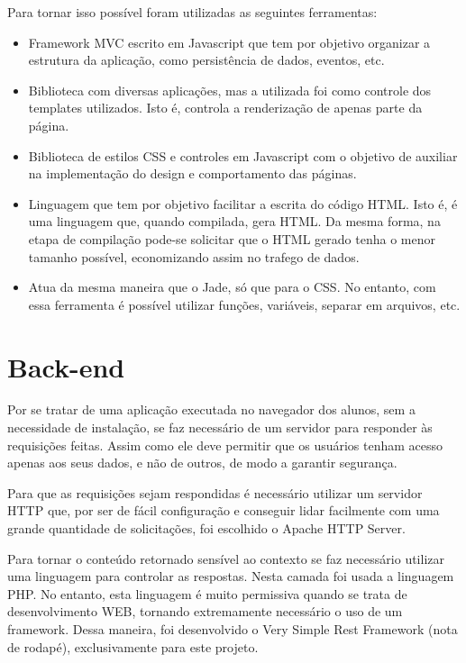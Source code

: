\documentclass[graduacao,brazil]{ThesisPUC}
\begin{document}
Para tornar isso possível foram utilizadas as seguintes ferramentas:
\begin{itemize}
	\item \cite{Backbone} Framework MVC escrito em Javascript que tem por objetivo organizar a estrutura da aplicação, como persistência de dados, eventos, etc.
	\item \cite{Underscore} Biblioteca com diversas aplicações, mas a utilizada foi como controle dos templates utilizados. Isto é, controla a renderização de apenas parte da página.
	\item \cite{Bootstrap} Biblioteca de estilos CSS e controles em Javascript com o objetivo de auxiliar na implementação do design e comportamento das páginas.
	\item \cite{Jade} Linguagem que tem por objetivo facilitar a escrita do código HTML. Isto é, é uma linguagem que, quando compilada, gera HTML. Da mesma forma, na etapa de compilação pode-se solicitar que o HTML gerado tenha o menor tamanho possível, economizando assim no trafego de dados.
	\item \cite{Less} Atua da mesma maneira que o Jade, só que para o CSS. No entanto, com essa ferramenta é possível utilizar funções, variáveis, separar em arquivos, etc.
\end{itemize}

\section{Back-end}

Por se tratar de uma aplicação executada no navegador dos alunos, sem a necessidade de instalação, se faz necessário de um servidor para responder às requisições feitas. Assim como ele deve permitir que os usuários tenham acesso apenas aos seus dados, e não de outros, de modo a garantir segurança.

Para que as requisições sejam respondidas é necessário utilizar um servidor HTTP que, por ser de fácil configuração e conseguir lidar facilmente com uma grande quantidade de solicitações, foi escolhido o Apache HTTP Server.

Para tornar o conteúdo retornado sensível ao contexto se faz necessário utilizar uma linguagem para controlar as respostas. Nesta camada foi usada a linguagem PHP. No entanto, esta linguagem é muito permissiva quando se trata de desenvolvimento WEB, tornando extremamente necessário o uso de um framework. Dessa maneira, foi desenvolvido o Very Simple Rest Framework (nota de rodapé), exclusivamente para este projeto.
\end{document}
